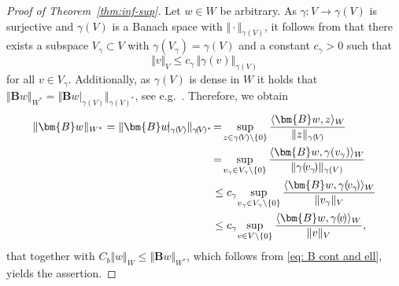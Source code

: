 \documentclass[12pt,twoside,reqno]{amsart}
\theoremstyle{definition}
\numberwithin{equation}{section}
\newcommand{\B} {\bm{B}}
\newcommand{\norm}[1]    {\Vert #1 \Vert}
\begin{document}
\begin{proof}[Proof of Theorem~\ref{thm:inf-sup}]
 Let $w\in W$ be arbitrary.
    As $\gamma:V\to \gamma(V)$ is surjective and $\gamma(V)$ is a Banach space with $\norm{\cdot}_{\gamma(V)}$, it follows from \cite[Lem.~2.3]{Burg2015} that there exists a subspace $V_\gamma\subset V$ with $\gamma(V_\gamma)=\gamma(V)$ and a constant $c_\gamma>0$ such that
        \begin{equation*}
            \norm{v}_V\leq c_\gamma\,\norm{\gamma(v)}_{\gamma(V)}
        \end{equation*}
        for all $v\in V_\gamma$.
        Additionally, as $\gamma(V)$ is dense in $W$ it holds that $\norm{\B w}_{W^*}=\norm{\B w|_{\gamma(V)}}_{\gamma(V)^*}$, see e.g.~\cite[Prop.~5.4]{Stein2011}.
        Therefore, we obtain 
        \begin{equation*}
            \aligned
            \norm{\B w}_{W^*}=
            \norm{\B w\!|_{\gamma(\!V\!)}}_{\gamma\!(\!V\!)^*}&\!=\!\sup\limits_{z\in \gamma(\!V\!)\backslash\{0\}}\frac{\langle\B w,z\rangle_W}{\norm{z}_{\gamma(\!V\!)}}\\
             &\!=\! \sup\limits_{v_\gamma\in V_\gamma\backslash\{0\}}\frac{\langle\B w,\gamma(v_\gamma)\rangle_W}{\norm{\gamma(\!v_\gamma\!)}_{\gamma(V)}}\\
             &\leq c_\gamma\!\sup\limits_{v_\gamma\in V_\gamma\backslash\{0\}}\frac{\langle\B w,\gamma(\!v_\gamma\!)\rangle_W}{\norm{v_\gamma}_{V}}\\
            &\leq c_\gamma\!\sup\limits_{v\in V\backslash\{0\}}\frac{\langle\B w,\gamma(\!v\!)\rangle_W}{\norm{v}_V},
            \endaligned
        \end{equation*}
        that together with $C_b \norm{w}_W \leq  \norm{\B w}_{W^*}$, which follows from \eqref{eq: B cont and ell}, yields the assertion.
\end{proof}


\end{document}
